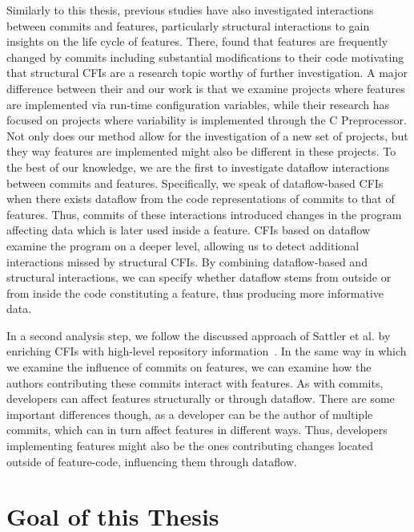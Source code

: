 Similarly to this thesis, previous studies have also investigated interactions between commits and features, particularly structural interactions to gain insights on the life cycle of features. 
There, \citet{michelon2021lifecycle} found that features are frequently changed by commits including substantial modifications to their code motivating that structural CFIs are a research topic worthy of further investigation.
A major difference between their and our work is that we examine projects where features are implemented via run-time configuration variables, while their research has focused on projects where variability is implemented through the C Preprocessor.
Not only does our method allow for the investigation of a new set of projects, but they way features are implemented might also be different in these projects.
To the best of our knowledge, we are the first to investigate dataflow interactions between commits and features.
Specifically, we speak of dataflow-based CFIs when there exists dataflow from the code representations of commits to that of features.
Thus, commits of these interactions introduced changes in the program affecting data which is later used inside a feature.
CFIs based on dataflow examine the program on a deeper level, allowing us to detect additional interactions missed by structural CFIs.
By combining dataflow-based and structural interactions, we can specify whether dataflow stems from outside or from inside the code constituting a feature, thus producing more informative data.

In a second analysis step, we follow the discussed approach of Sattler et al. by enriching CFIs with high-level repository information~\cite{sattler2023seal}.
In the same way in which we examine the influence of commits on features, we can examine how the authors contributing these commits interact with features.
As with commits, developers can affect features structurally or through dataflow.
There are some important differences though, as a developer can be the author of multiple commits, which can in turn affect features in different ways.
Thus, developers implementing features might also be the ones contributing changes located outside of feature-code, influencing them through dataflow.

\section{Goal of this Thesis}

